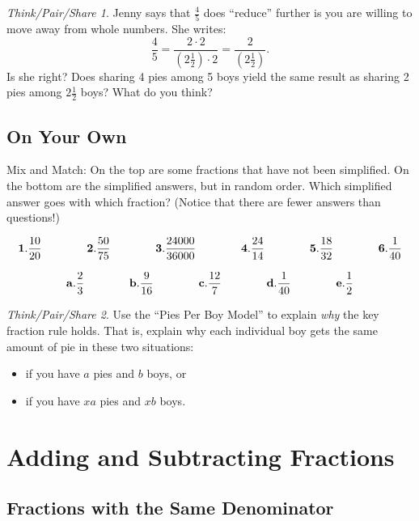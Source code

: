\documentclass[10pt, reqno]{amsart}
\theoremstyle{remark}
\newtheorem*{thinkpair*}{Think/Pair/Share}
\theoremstyle{definition}
\numberwithin{equation}{section}  %
\begin{document}
 \begin{thinkpair*}
 Jenny says that $\frac 4 5$
does ``reduce'' further is you are willing to move
away from whole numbers. She writes:
 \[
 \frac{4}{5} = 
 \frac{2\cdot 2}{\left(2\frac 1 2\right) \cdot 2}=
 \frac{2}{\left(2\frac 1 2\right)}.
 \]
Is she right? Does sharing 4 pies among 5 boys yield the same result as sharing 2
pies among $2\frac 1 2$ boys?
What do you think?
 
 \end{thinkpair*}
 


\subsection*{On Your Own}
Mix and Match: On the top are some fractions that have not
been simplified. On the bottom are the simplified answers, but in random order.
Which simplified answer goes with which fraction? (Notice that there are fewer
answers than questions!)

\[
{\bf 1.} \frac{10}{20} 
\qquad\qquad
{\bf 2.} \frac{50}{75} 
\qquad\qquad
{\bf 3.} \frac{24000}{36000} 
\qquad\qquad
{\bf 4.} \frac{24}{14} 
\qquad\qquad
{\bf 5.} \frac{18}{32} 
\qquad\qquad
{\bf 6.} \frac{1}{40} 
\]

\[
{\bf a.} \frac{2}{3} 
\qquad\qquad
{\bf b.} \frac{9}{16} 
\qquad\qquad
{\bf c.} \frac{12}{7} 
\qquad\qquad
{\bf d.} \frac{1}{40} 
\qquad\qquad
{\bf e.} \frac{1}{2} 
\]


\begin{thinkpair*}
Use the ``Pies Per Boy Model'' to explain \emph{why} the key fraction rule holds.  That is, explain why each individual boy gets the same amount of pie in these two situations:
\begin{itemize}
\item
 if you have $a$ pies and $b$ boys, or
 \item
  if you have $xa$ pies and $xb$ boys.
  \end{itemize}
\end{thinkpair*}





\section{Adding and Subtracting Fractions}

\subsection{Fractions with the Same Denominator}
\end{document}
